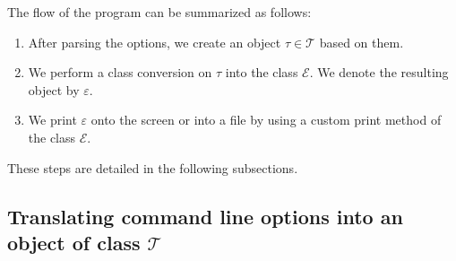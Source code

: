 \documentclass{scrartcl}
\begin{document}
The flow of the program can be summarized as follows:
\begin{enumerate}
\item After parsing the options, we create an object $\tau\in\mathcal{T}$ based on them.
\item We perform a class conversion on $\tau$ into the class $\mathcal{E}$. We denote the resulting object by $\varepsilon$.
\item We print $\varepsilon$ onto the screen or into a file by using a custom print method of the class $\mathcal{E}$.
\end{enumerate}

\begin{comment}
\begin{center}
\begin{tikzpicture}
\node[fill,circle] (start) at (0,0);
\node[anchor=east] at (-.2,0) {START};
\node (o) at (4,0) {$O$};
\node (r) at (8,0) {$R$};
\node at (2,.3) {\small parsing options};
\node at (6,.3) {\small class conversion};
\node at (10,.3) {\small printing results};
\node[fill,circle] (stop) at (12,0);
\node[anchor=west] at (12.2,0) {STOP};
\draw[->,thick] (start) -- (o);
\draw[->,thick] (o) -- (r);
\draw[->,thick] (r) -- (stop);
\end{tikzpicture}
\end{center}
\end{comment}

These steps are detailed in the following subsections.

\subsection{Translating command line options into an object of class $\mathcal{T}$}
\end{document}
